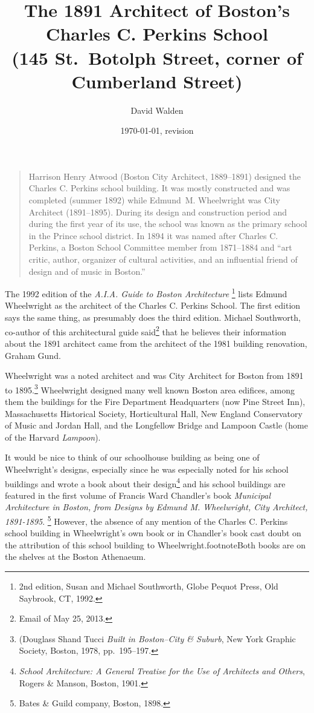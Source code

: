 \documentclass{article}
\title{The 1891 Architect of Boston's Charles C. Perkins School\\
\normalsize (145 St.\ Botolph Street, corner of Cumberland Street)}
\author{David Walden}
\date{\today, revision}
\begin{document}
\maketitle

\begin{quote}
\noindent{}Harrison Henry Atwood (Boston City Architect, 1889--1891) designed the Charles
C. Perkins school building.  It was mostly constructed and was completed (summer 1892)
while Edmund~M. Wheelwright was City Architect (1891--1895).  During its design and
construction period and during the first year of its use, the school was known as the
primary school in the Prince school district. In 1894 it was named after Charles C.
Perkins, a Boston School Committee member from 1871--1884 and ``art critic, author,
organizer of cultural activities, and an influential friend of design and of music in
Boston.''
\end{quote}

\bigskip
\noindent The 1992 edition of the \textit{A.I.A. Guide to Boston Architecture} \footnote{2nd
edition, Susan and Michael Southworth, Globe Pequot Press, Old Saybrook, CT, 1992.} lists
Edmund Wheelwright as the architect of the Charles C. Perkins School.  The first edition
says the same thing, as presumably does the third edition.  Michael Southworth, co-author
of this architectural guide said\footnote{Email of May 25, 2013.} that he believes their
information about the 1891 architect came from the architect of the 1981 building
renovation, Graham Gund.

Wheelwright was a noted architect and was City Architect for Boston from 1891 to 1895.\footnote{(Douglass Shand Tucci \textit{Built in
Boston--City \& Suburb}, New York Graphic Society, Boston, 1978, pp.\ 195--197.}
Wheelwright designed many well known Boston area edifices, among them the buildings for
the Fire Department Headquarters (now Pine Street Inn), Massachusetts Historical Society,
Horticultural Hall, New England Conservatory of Music and Jordan Hall, and the Longfellow
Bridge and Lampoon Castle (home of the Harvard \textit{Lampoon}).

It would be nice to think of our schoolhouse building as being one of Wheelwright's
designs, especially since he was especially noted for his school buildings and wrote a
book about their design\footnote{\textit{School Architecture: A General Treatise for the Use of
Architects and Others}, Rogers \& Manson, Boston, 1901.} and his school buildings are
featured in the first volume of Francis Ward Chandler's book \textit{Municipal
Architecture in Boston, from Designs by Edmund M. Wheelwright, City Architect, 1891-1895}.
\footnote{Bates \& Guild company, Boston, 1898.}  However, the absence of any mention of the
Charles C. Perkins school building in Wheelwright's own book or in Chandler's book cast
doubt on the attribution of this school building to Wheelwright.footnote{Both books are on the
shelves at the Boston Athenaeum.}
\end{document}
